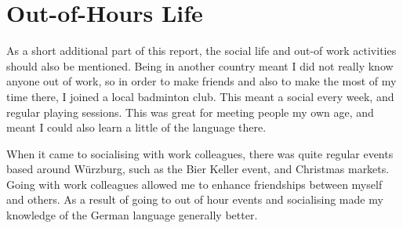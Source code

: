 \documentclass[12pt]{article}
\begin{document}
\section{Out-of-Hours Life}
As a short additional part of this report, the social life and out-of work activities should also be mentioned. Being in
another country meant I did not really know anyone out of work, so in order to make friends and also to make the most of
my time there, I joined a local badminton club. This meant a social every week, and regular playing sessions. This was
great for meeting people my own age, and meant I could also learn a little of the language there.\\ \par \noindent
When it came to socialising with work colleagues, there was quite regular events based around Würzburg, such as the Bier
Keller event, and Christmas markets. Going with work colleagues allowed me to enhance friendships between myself and
others. As a result of going to out of hour events and socialising made my knowledge of the German language generally
better.
\clearpage


\end{document}
